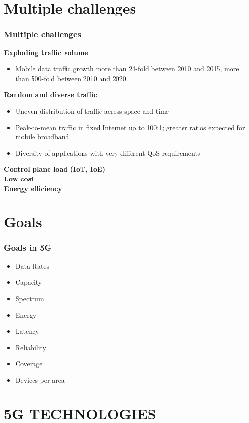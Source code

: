 \documentclass{beamer}
\begin{document}
\section{Multiple challenges}
\begin{frame}
\frametitle{Multiple challenges}
\textbf{Exploding traffic volume}
\begin{itemize}
\item Mobile data traffic growth more than 24-fold between 2010 and 2015, more than 500-fold between 2010 and 2020.
\end{itemize}
\textbf{Random and diverse traffic}
\begin{itemize}
\item Uneven distribution of traffic across space and time\\
\item Peak-to-mean traffic in fixed Internet up to 100:1; greater ratios expected for mobile broadband\\
\item Diversity of applications with very different QoS requirements\\
\end{itemize}
\textbf{Control plane load (IoT, IoE)}\\
\textbf{Low cost}\\
\textbf{Energy efficiency}\\

\end{frame}
\section{Goals}
\begin{frame}
\frametitle{Goals in 5G}
\begin{itemize}
\item Data Rates
\item Capacity
\item Spectrum
\item Energy
\item Latency
\item Reliability
\item Coverage
\item Devices per area
\end{itemize}
\end{frame}
\section{5G TECHNOLOGIES}
\end{document}
